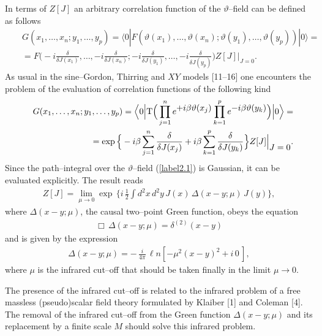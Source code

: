 \documentclass[a4paper,12pt] {article}
\begin{document}
In terms of $Z[J]$ an arbitrary correlation function of the
$\vartheta$--field can be defined as follows
%
\begin{eqnarray}\label{label2.2}
&&G(x_1,\ldots,x_n;y_1,\ldots,y_p) = \langle
0|F(\vartheta(x_1),\ldots,\vartheta(x_n);\vartheta(y_1),\ldots,\vartheta(y_p))|0\rangle
= \nonumber\\ &&= F\Big(-i\frac{\delta}{\delta
J(x_1)},\ldots,-i\frac{\delta}{\delta J(x_n)};- i\frac{\delta}{\delta
J(y_1)},\ldots,-i\frac{\delta}{\delta
J(y_p)}\Big)Z[J]\Big|_{\textstyle J = 0}.
\end{eqnarray}
%
As usual in the sine--Gordon, Thirring and $XY$ models [11--16] one
encounters the problem of the evaluation of correlation functions of
the following kind
%
\begin{eqnarray}\label{label2.3}
&&G(x_1,\ldots,x_n;y_1,\ldots,y_p) = \Big\langle 0\Big|{\rm
T}\Big(\prod^n_{j=1}e^{\textstyle +
i\beta\vartheta(x_j)}\prod^p_{k=1}e^{\textstyle
-i\beta\vartheta(y_k)}\Big)\Big|0\Big\rangle=\nonumber\\
&&=\exp\Big\{-i\beta\sum^n_{j = 1}\frac{\delta}{\delta J(x_j)} +
i\beta\sum^p_{k = 1}\frac{\delta}{\delta
J(y_k)}\Big\}Z[J]\Big|_{\textstyle J = 0}.
\end{eqnarray}
%
Since the path--integral over the $\vartheta$--field (\ref{label2.1})
is Gaussian, it can be evaluated explicitly. The result reads
%
\begin{eqnarray}\label{label2.4}
Z[J] = \lim_{\textstyle \mu \to 0}\exp\,\Big\{i\,\frac{1}{2}\int
d^2x\,d^2y\,J(x)\,\Delta(x-y;\mu)\,J(y)\Big\},
\end{eqnarray}
%
where $\Delta(x-y;\mu)$, the causal two--point Green function, obeys
the equation
%
\begin{eqnarray}\label{label2.5}
\Box\,\Delta(x-y;\mu) = \delta^{(2)}(x-y)
\end{eqnarray}
%
and is given by the expression 
%
\begin{eqnarray}\label{label2.6}
\Delta(x-y;\mu) =-\,\frac{i}{4\pi}\,{\ell n}[-\mu^2(x-y)^2 + i\,0\,],
\end{eqnarray}
%
where $\mu$ is the infrared cut--off that should be taken finally in
the limit $\mu \to 0$. 

The presence of the infrared cut--off is related to the infrared
problem of a free massless (pseudo)scalar field theory formulated by
Klaiber [1] and Coleman [4]. The removal of the infrared cut--off from
the Green function $\Delta(x-y;\mu)$ and its replacement by a finite
scale $M$ should solve this infrared problem.
\end{document}
